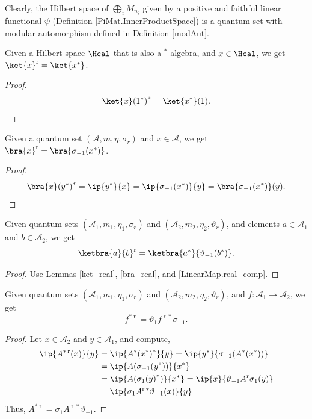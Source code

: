  Clearly, the Hilbert space of $\bigoplus_iM_{n_i}$ given by a positive and faithful linear functional $\psi$ (Definition \ref{PiMat.InnerProductSpace}) is a quantum set with modular automorphism defined in Definition \ref{modAut}.
 
 \begin{lemma}\label{ket_real}\leanok
  Given a Hilbert space $\Hcal$ that is also a $^*$-algebra, and $x\in\Hcal$, we get $\ket{x}^{\operatorname{r}}=\ket{x^*}$.
 \end{lemma}
 \begin{proof}\leanok
  \[{\ket{x}(1^*)}^*=\ket{x^*}(1).\]
 \end{proof}

 \begin{lemma}\label{bra_real}\leanok
  Given a quantum set $(\mathcal{A},m,\eta,\sigma_r)$ and $x\in\mathcal{A}$, we get $\bra{x}^{\operatorname{r}}=\bra{\sigma_{-1}(x^*)}$.
 \end{lemma}
 \begin{proof}\leanok
  \[{\bra{x}(y^*)}^*=\ip{y^*}{x}=\ip{\sigma_{-1}(x^*)}{y}=\bra{\sigma_{-1}(x^*)}(y).\]
 \end{proof}
 \begin{corollary}\label{rankOne_real}
  \leanok
  Given quantum sets $(\mathcal{A}_1,m_1,\eta_1,\sigma_r)$ and $(\mathcal{A}_2,m_2,\eta_2,\vartheta_r)$, and elements $a\in\mathcal{A}_1$ and $b\in\mathcal{A}_2$, we get
  \[\ketbra{a}{b}^{\operatorname{r}}=\ketbra{a^*}{\vartheta_{-1}(b^*)}.\]
 \end{corollary}
 \begin{proof}\leanok
  Use Lemmas \ref{ket_real}, \ref{bra_real}, and \ref{LinearMap.real_comp}.
 \end{proof}

 \begin{proposition}\label{LinearMap.adjoint_real_eq}
  \leanok
  Given quantum sets $(\mathcal{A}_1,m_1,\eta_1,\sigma_r)$ and $(\mathcal{A}_2,m_2,\eta_2,\vartheta_r)$, and $f\colon\mathcal{A}_1\to\mathcal{A}_2$, we get
  \[ f^{*\operatorname{r}}=\vartheta_1f^{\operatorname{r}*}\sigma_{-1}.\]
 \end{proposition}
 \begin{proof}\leanok
  Let $x\in{\mathcal{A}_2}$ and $y\in \mathcal{A}_1$, and compute,
  \begin{align*}
   \ip{{A^{*\operatorname{r}}}(x)}{y} &= \ip{{A^*(x^*)}^*}{y} =\ip{y^*}{\sigma_{-1}(A^*(x^*))}\\
   &= \ip{A(\sigma_{-1}(y^*))}{x^*}\\
   &= \ip{A({\sigma_{1}(y)}^*)}{x^*}
   = \ip{x}{\vartheta_{-1}A^{\operatorname{r}}\sigma_{1}(y)}\\
   &= \ip{\sigma_{1}A^{\operatorname{r}*}\vartheta_{-1}(x)}{y}
  \end{align*}
  Thus, $A^{*\operatorname{r}}=\sigma_{1}A^{\operatorname{r}*}\vartheta_{-1}$.
 \end{proof}

